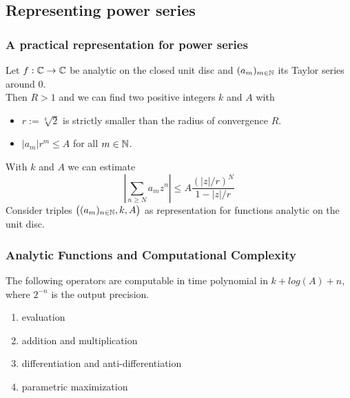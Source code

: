
\subsection{Representing power series}
\begin{frame}
\frametitle{A practical representation for power series}
\begin{lemma}
Let $f : \mathbb{C} \to \mathbb{C}$ be analytic on the closed unit disc and $(a_m)_{m\in\mathbb{N}}$ its Taylor series around $0$.\\
Then $R>1$ \pause and we can find two positive integers $k$ and $A$ with 
\begin{itemize}
\item $r := \sqrt[k]{2}$ is strictly smaller than the radius of convergence $R$.
\item $|a_m|r^m \leq A$ for all $m \in \mathbb{N}$.
\end{itemize}
\end{lemma}
\pause
With $k$ and $A$ we can estimate 
$$ \left | \sum_{n \geq N} a_m z^n \right | \leq A\frac{(|z|/r)^N}{1-|z|/r} $$\pause
Consider triples $\big((a_m)_{n \in \mathbb{N}}, k, A\big)$ as representation for functions analytic on the unit disc.
\end{frame}
\begin{frame}[<+->]
\frametitle{Analytic Functions and Computational Complexity}
\begin{theorem}
  The following operators are computable in time polynomial in $k+log(A)+n$, where $2^{-n}$ is the output precision.
\begin{enumerate}
\item evaluation
\item addition and multiplication
\item differentiation and anti-differentiation
\item parametric maximization
\end{enumerate}
\end{theorem}
\end{frame}
